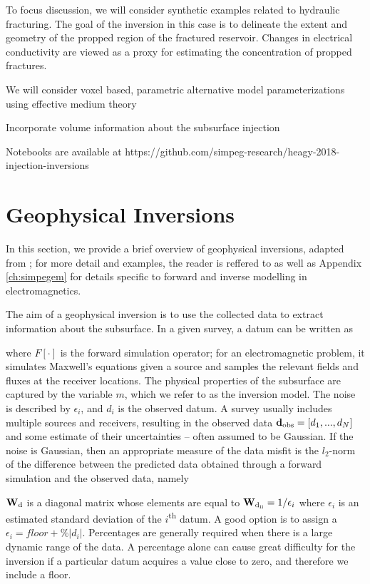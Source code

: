 To focus discussion, we will consider synthetic examples related to hydraulic fracturing. The goal of the inversion in this case is to delineate the extent and geometry of the propped region of the fractured reservoir. Changes in electrical conductivity are viewed as a proxy for estimating the concentration of propped fractures.


We will consider voxel based, parametric
alternative model parameterizations using effective medium theory

Incorporate volume information about the subsurface injection

Notebooks are available at https://github.com/simpeg-research/heagy-2018-injection-inversions


\section{Geophysical Inversions}
In this section, we provide a brief overview of geophysical inversions, adapted from \cite{Cockett2015}; for more detail and examples, the reader is reffered to \cite{Oldenburg2005, Cockett2015} as well as Appendix \ref{ch:simpegem} for details specific to forward and inverse modelling in electromagnetics.

The aim of a geophysical inversion is to use the collected data to extract information about the subsurface. In a given survey, a datum can be written as


where $F[\cdot]$ is the forward simulation operator; for an electromagnetic problem, it simulates Maxwell’s equations given a source and samples the relevant fields and fluxes at the receiver locations. The physical properties of the subsurface are captured by the variable $m$, which we refer to as the inversion model. The noise is described by $\epsilon_i$, and $d_i$ is the observed datum. A survey usually includes multiple sources and receivers, resulting in the observed data $\mathbf{d}_{\rm obs} = [d_1, ... , d_N]$ and some estimate of their uncertainties -- often assumed to be Gaussian. If the noise is Gaussian, then an appropriate measure of the data misfit is the $l_2$-norm of the difference between the predicted data obtained through a forward simulation and the observed data, namely


$\mathbf{W}_{\rm d}$ is a diagonal matrix whose elements are equal to $\mathbf{W}_{\rm d_{ii}}=1/\epsilon_i$ where $\epsilon_i$ is an estimated standard deviation of the $i$\textsuperscript{th} datum. A good option is to assign a $\epsilon_i = floor + \%|d_i|$.
Percentages are generally required when there is a large dynamic range of the data. A percentage alone can cause great difficulty for the inversion if a particular datum acquires a value close to zero, and therefore we include a floor.

